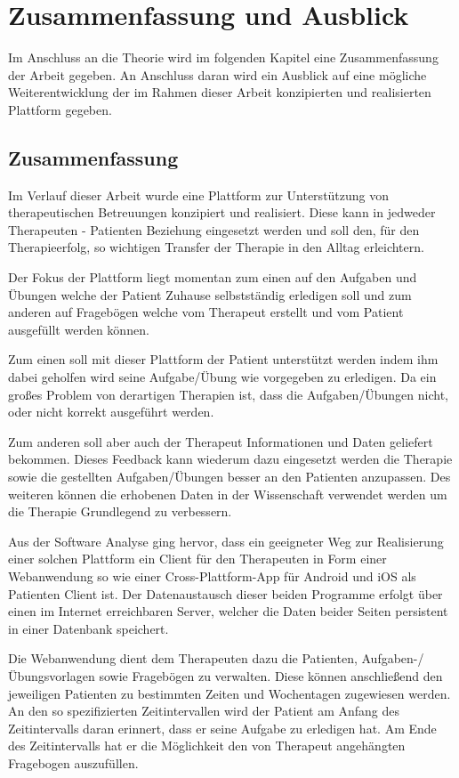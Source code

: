 \chapter{Zusammenfassung und Ausblick} \label{_ZusammenfassungundAusblick}
Im Anschluss an die Theorie wird im folgenden Kapitel eine Zusammenfassung der Arbeit gegeben. An Anschluss daran wird ein Ausblick auf eine mögliche Weiterentwicklung der im Rahmen dieser Arbeit konzipierten und realisierten Plattform gegeben. 
\section{Zusammenfassung}
Im Verlauf dieser Arbeit wurde eine Plattform zur Unterstützung von therapeutischen Betreuungen konzipiert und realisiert. Diese kann in jedweder Therapeuten - Patienten Beziehung eingesetzt werden und soll den, für den Therapieerfolg, so wichtigen Transfer der Therapie in den Alltag erleichtern.

Der Fokus der Plattform liegt momentan zum einen auf den Aufgaben und Übungen welche der Patient Zuhause selbstständig erledigen soll und zum anderen auf Fragebögen welche vom Therapeut erstellt und vom Patient ausgefüllt werden können.

Zum einen soll mit dieser Plattform der Patient unterstützt werden indem ihm dabei geholfen wird seine Aufgabe/Übung wie vorgegeben zu erledigen. Da ein großes Problem von derartigen Therapien ist, dass die Aufgaben/Übungen nicht, oder nicht korrekt ausgeführt werden.

Zum anderen soll aber auch der Therapeut Informationen und Daten geliefert bekommen. Dieses Feedback kann wiederum dazu eingesetzt werden die Therapie sowie die gestellten Aufgaben/Übungen besser an den Patienten anzupassen. Des weiteren können die erhobenen Daten in der Wissenschaft verwendet werden um die Therapie Grundlegend zu verbessern.

Aus der Software Analyse ging hervor, dass ein geeigneter Weg zur Realisierung einer solchen Plattform ein Client für den Therapeuten in Form einer Webanwendung so wie einer Cross-Plattform-App für Android und iOS als Patienten Client ist. Der Datenaustausch dieser beiden Programme erfolgt über einen im Internet erreichbaren Server, welcher die Daten beider Seiten persistent in einer Datenbank speichert.

Die Webanwendung dient dem Therapeuten dazu die Patienten, Aufgaben-/Übungsvorlagen sowie Fragebögen zu verwalten. Diese können anschließend den jeweiligen Patienten zu bestimmten Zeiten und Wochentagen zugewiesen werden. An den so spezifizierten Zeitintervallen wird der Patient am Anfang des Zeitintervalls daran erinnert, dass er seine Aufgabe zu erledigen hat. Am Ende des Zeitintervalls hat er die Möglichkeit den von Therapeut angehängten Fragebogen auszufüllen.

